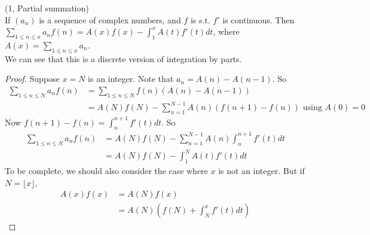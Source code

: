 \documentclass[a4paper]{article}
\begin{document}
\begin{lemma} (1, Partial summation)\\
If $(a_n)$ is a sequence of complex numbers, and $f$ is s.t. $f'$ is continuous. Then $\sum_{1 \leq n \leq x} a_n f(n) = A(x) f(x) - \int_1^x A(t) f'(t) dt$, where $A(x) = \sum_{1 \leq n \leq x} a_n$.\\
We can see that this is a discrete version of integration by parts.
\begin{proof}
Suppose $x=N$ is an integer. Note that $a_n = A(n) - A(n-1)$. So
\begin{equation*}
\begin{aligned}
\sum_{1 \leq n \leq N} a_nf(n) &= \sum_{1 \leq n \leq N} f(n) (A(n)-A(n-1))\\
&= A(N)f(N) - \sum_{n=1}^{N-1}A(n) (f(n+1)-f(n)) \text{ using } A(0)=0
\end{aligned}
\end{equation*}
Now $f(n+1)-f(n) = \int_n^{n+1} f'(t)dt$. So
\begin{equation*}
\begin{aligned}
\sum_{1 \leq n \leq N} a_n f(n) &= A(N)f(N) - \sum_{n=1}^{N-1} A(n) \int_n^{n+1} f'(t) dt\\
&= A(N)f(N) - \int_1^N A(t) f'(t) dt
\end{aligned}
\end{equation*}
To be complete, we should also consider the case where $x$ is not an integer. But if $N=\lfloor x \rfloor$,
\begin{equation*}
\begin{aligned}
A(x) f(x) &= A(N)f(x)\\
&=A(N)\left(f(N)+\int_N^x f'(t)dt\right)
\end{aligned}
\end{equation*}
\end{proof}
\end{lemma}
\end{document}
